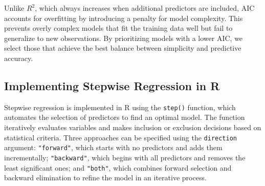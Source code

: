 \documentclass[
  11pt,
]{book}
\newcommand{\passthrough}[1]{#1}
\theoremstyle{definition}
\theoremstyle{definition}
\theoremstyle{definition}
\theoremstyle{definition}
\theoremstyle{remark}
\begin{document}
Unlike \(R^2\), which always increases when additional predictors are included, AIC accounts for overfitting by introducing a penalty for model complexity. This prevents overly complex models that fit the training data well but fail to generalize to new observations. By prioritizing models with a lower AIC, we select those that achieve the best balance between simplicity and predictive accuracy.

\subsection*{Implementing Stepwise Regression in R}\label{implementing-stepwise-regression-in-r}


Stepwise regression is implemented in R using the \passthrough{\lstinline!step()!} function, which automates the selection of predictors to find an optimal model. The function iteratively evaluates variables and makes inclusion or exclusion decisions based on statistical criteria. Three approaches can be specified using the \passthrough{\lstinline!direction!} argument: \passthrough{\lstinline!"forward"!}, which starts with no predictors and adds them incrementally; \passthrough{\lstinline!"backward"!}, which begins with all predictors and removes the least significant ones; and \passthrough{\lstinline!"both"!}, which combines forward selection and backward elimination to refine the model in an iterative process.
\end{document}
